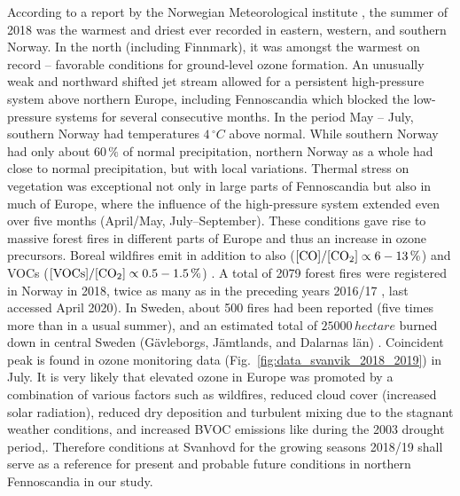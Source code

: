 \documentclass[bg, manuscript]{copernicus}
\begin{document}
According to a report by the Norwegian Meteorological institute \citep{MetNOR2019}, the summer of 2018 was the warmest and driest ever recorded in eastern, western, and southern Norway. In the north (including Finnmark), it was amongst the warmest on record -- favorable conditions for ground-level ozone formation.
An unusually weak and northward shifted jet stream allowed for a persistent high-pressure system above northern Europe, including Fennoscandia which blocked the low-pressure systems for several consecutive months. In the period May -- July, southern Norway had temperatures $4\,\unit{^\circ C}$ above normal. While southern Norway had only about $60\,\unit{\%}$ of normal precipitation, northern Norway as a whole had close to normal precipitation, but with local variations.
Thermal stress on vegetation was exceptional not only in large parts of Fennoscandia but also in much of Europe, where the influence of the high-pressure system extended even over five months (April/May, July--September). These conditions gave rise to massive forest fires in different parts of Europe and thus an increase in ozone precursors. Boreal wildfires emit in addition to  also  ($\chem{[CO]}/\chem{[CO_2]} \propto 6-13\,\unit{\%}$) and VOCs ($\chem{[VOCs]}/\chem{[CO_2]} \propto 0.5-1.5\,\unit{\%}$) \citep{AE:Cofer1990}.
A total of 2079 forest fires were registered in Norway in 2018, twice as many as in the preceding years 2016/17 \citep{DSB2019}, last accessed April 2020). In Sweden, about 500 fires had been reported (five times more than in a usual summer), and an estimated total of $25000\,\unit{hectare}$ burned down in central Sweden (G\"{a}vleborgs, J\"{a}mtlands, and Dalarnas l\"{a}n) \citep{SOU2019}. Coincident peak \chem{[O_3]} is found in ozone monitoring data (Fig.~\ref{fig:data_svanvik_2018_2019}) in July. It is very likely that elevated ozone in Europe was promoted by a combination of various factors such as wildfires, reduced cloud cover (increased solar radiation), reduced dry deposition and turbulent mixing due to the stagnant weather conditions, and increased BVOC emissions like during the 2003 drought period,\citep{JGR:Solberg2018}. Therefore conditions at Svanhovd for the growing seasons 2018/19 shall serve as a reference for present and probable future conditions in northern Fennoscandia in our study.\\
\end{document}
